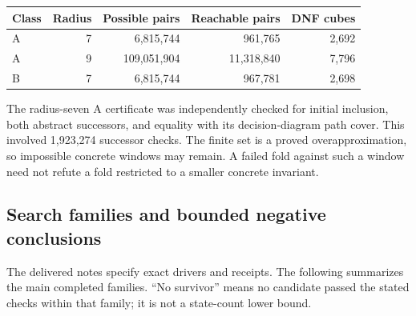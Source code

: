 \documentclass[11pt,a4paper]{article}
\theoremstyle{definition}
\begin{document}
\begin{center}
\begin{tabular}{@{}lrrrr@{}}
\toprule
Class & Radius & Possible pairs & Reachable pairs & DNF cubes\\
\midrule
A & 7 & 6,815,744 & 961,765 & 2,692\\
A & 9 & 109,051,904 & 11,318,840 & 7,796\\
B & 7 & 6,815,744 & 967,781 & 2,698\\
\bottomrule
\end{tabular}
\end{center}
The radius-seven A certificate was independently checked for initial inclusion, both abstract successors, and equality with its decision-diagram path cover. This involved 1,923,274 successor checks. The finite set is a proved overapproximation, so impossible concrete windows may remain. A failed fold against such a window need not refute a fold restricted to a smaller concrete invariant.

\subsection{Search families and bounded negative conclusions}

The delivered notes specify exact drivers and receipts. The following summarizes the main completed families. ``No survivor'' means no candidate passed the stated checks within that family; it is not a state-count lower bound.
\end{document}
